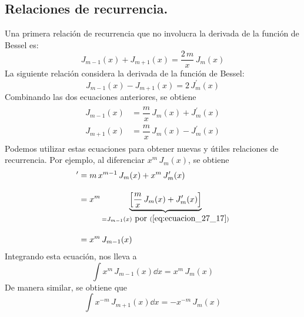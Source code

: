 \subsection{Relaciones de recurrencia.}
Una primera relación de recurrencia que no involucra la derivada de la función de Bessel es:
\begin{equation}
J_{m-1} (x) + J_{m+1} (x) = \dfrac{2 \, m}{x} \, J_{m} (x)
\label{eq:ecuacion_27_15}
\end{equation}
La siguiente relación considera la derivada de la función de Bessel:
\begin{equation}
J_{m-1} (x) - J_{m+1} (x) = 2 \, J_{m}^{\prime} (x)
\label{eq:ecuacion_27_16}
\end{equation}
Combinando las dos ecuaciones anteriores, se obtiene
\begin{align}
\begin{aligned}
J_{m-1}(x) &= \dfrac{m}{x} \, J_{m} (x) + J_{m}^{\prime} (x) \\[0.5em]
J_{m+1}(x) &= \dfrac{m}{x} \, J_{m} (x) - J_{m}^{\prime} (x)
\end{aligned}
\label{eq:ecuacion_27_17}
\end{align}
Podemos utilizar estas ecuaciones para obtener nuevas y útiles relaciones de recurrencia. Por ejemplo, al diferenciar $x^{m} \, J_{m} (x)$, se obtiene
\begin{align*}
[x^{m} \, J_{m} (x)]^{\prime} &= m \, x^{m-1} \, J_{m} (x) + x^{m} \, J_{m}^{\prime} (x) \\[1em]
&= x^{m} \underbrace{ \left[ \dfrac{m}{x} \, J_{m} (x) + J_{m}^{\prime} (x)\right]}_{=J_{m-1}(x) \mbox{ por } (\ref{eq:ecuacion_27_17})}  \\[1em]
&= x^{m} \, J_{m-1} (x)
\end{align*}
Integrando esta ecuación, nos lleva a
\begin{equation}
\int x^{m} \, J_{m-1} (x) \dd{x} = x^{m} \, J_{m} (x)
\label{eq:ecuacion_27_18}
\end{equation}
De manera similar, se obtiene que
\begin{equation}
\int x^{-m} \, J_{m+1} (x) \dd{x} = -x^{-m} \, J_{m} (x)
\label{eq:ecuacion_27_19}
\end{equation}
